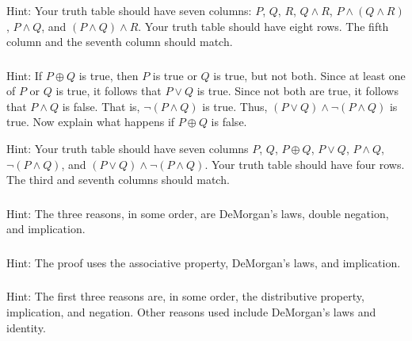 \subsubsection*{ \answers}
Hint: Your truth table should have seven columns: $P$, $Q$, $R$, $Q \land R$, $P \land (Q \land R)$, $P \land Q$, and $(P \land Q) \land R$.  Your truth table should have eight rows.  The fifth column and the seventh column should match.

\subsubsection*{ \answers}
\begin{apart}
    \item Hint: If $P \oplus Q$ is true, then $P$ is true or $Q$ is true, but not both.  Since at least one of $P$ or $Q$ is true, it follows that $P \lor Q$ is true.  Since not both are true, it follows that $P \land Q$ is false.  That is, $\neg(P \land Q)$ is true.  Thus, $(P \lor Q) \land \neg(P \land Q)$ is true. Now explain what happens if $P \oplus Q$ is false.
    \item Hint: Your truth table should have seven columns $P$, $Q$, $P \oplus Q$, $P \lor Q$, $P \land Q$, $\neg(P \land Q)$, and $(P \lor Q) \land \neg (P \land Q)$.  Your truth table should have four rows.  The third and seventh columns should match. 
\end{apart}

\subsubsection*{ \answers}
Hint: The three reasons, in some order, are DeMorgan's laws, double negation, and implication.

\subsubsection*{ \answers}
Hint: The proof uses the associative property, DeMorgan's laws, and implication.

\subsubsection*{ \answers}
Hint: The first three reasons are, in some order, the distributive property, implication, and negation.  Other reasons used include DeMorgan's laws and identity.

